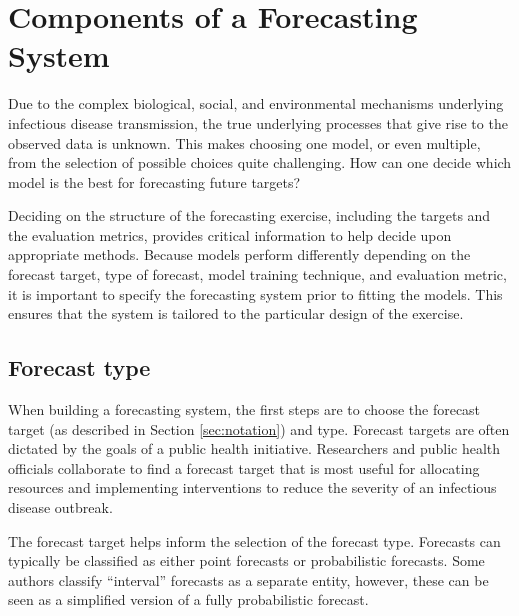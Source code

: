 \documentclass[a4paper]{article}
\begin{document}
\section{Components of a Forecasting System}

Due to the complex biological, social, and environmental mechanisms underlying infectious disease transmission, the true underlying processes that give rise to the observed data is unknown.
This makes choosing one model, or even multiple, from the selection of possible choices quite challenging.
How can one decide which model is the best for forecasting future targets?

Deciding on the structure of the forecasting exercise, including the targets and the evaluation metrics, provides critical information to help decide upon appropriate methods.
Because models perform differently depending on the forecast target, type of forecast, model training technique, and evaluation metric, it is important to specify the forecasting system prior to fitting the models.\cite{Armstrong2001} 
This ensures that the system is tailored to the particular design of the exercise.

\subsection{Forecast type}

When building a forecasting system, the first steps are to choose the forecast target (as described in Section \ref{sec:notation}) and type.
Forecast targets are often dictated by the goals of a public health initiative.
Researchers and public health officials collaborate to find a forecast target that is most useful for allocating resources and implementing interventions to reduce the severity of an infectious disease outbreak.

The forecast target helps inform the selection of the forecast type. Forecasts can typically be classified as either point forecasts or probabilistic forecasts. Some authors classify ``interval'' forecasts as a separate entity\cite{Diebold2001}, however, these can be seen as a simplified version of a fully probabilistic forecast.
\end{document}
